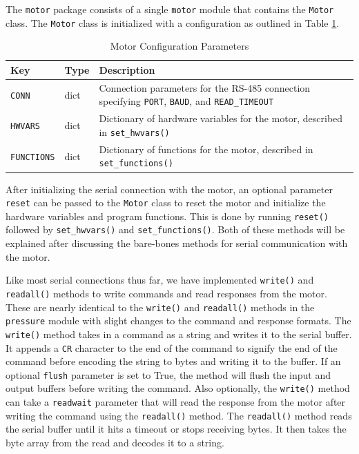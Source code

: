 The \texttt{motor} package consists of a single \texttt{motor} module that contains the \texttt{Motor} class.
The \texttt{Motor} class is initialized with a configuration as outlined in Table \ref{readout/table:motor_config}.

\begin{table}
    \centering
    \begin{tabularx}{\textwidth}{l|l|X}
        \textbf{Key} & \textbf{Type} & \textbf{Description} \\ \hline    
        \texttt{CONN} & dict & Connection parameters for the RS-485 connection specifying \texttt{PORT}, \texttt{BAUD}, and \texttt{READ\_TIMEOUT} \\
        \texttt{HWVARS} & dict & Dictionary of hardware variables for the motor, described in \texttt{set\_hwvars()}\\
        \texttt{FUNCTIONS} & dict & Dictionary of functions for the motor, described in \texttt{set\_functions()}\\
    \end{tabularx}
    \caption{Motor Configuration Parameters}
    \label{readout/table:motor_config}
\end{table}

After initializing the serial connection with the motor, an optional parameter \texttt{reset} can be passed to the \texttt{Motor} class to reset the motor and initialize the hardware variables and program functions.
This is done by running \texttt{reset()} followed by \texttt{set\_hwvars()} and \texttt{set\_functions()}.
Both of these methods will be explained after discussing the bare-bones methods for serial communication with the motor.

Like most serial connections thus far, we have implemented \texttt{write()} and \texttt{readall()} methods to write commands and read responses from the motor.
These are nearly identical to the \texttt{write()} and \texttt{readall()} methods in the \texttt{pressure} module with slight changes to the command and response formats.
The \texttt{write()} method takes in a command as a string and writes it to the serial buffer.
It appends a \texttt{CR} character to the end of the command to signify the end of the command before encoding the string to bytes and writing it to the buffer.
If an optional \texttt{flush} parameter is set to True, the method will flush the input and output buffers before writing the command.
Also optionally, the \texttt{write()} method can take a \texttt{readwait} parameter that will read the response from the motor after writing the command using the \texttt{readall()} method.
The \texttt{readall()} method reads the serial buffer until it hits a timeout or stops receiving bytes.
It then takes the byte array from the read and decodes it to a string.

